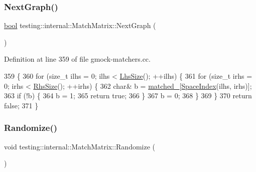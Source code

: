 \subsubsection{\texorpdfstring{Next\+Graph()}{NextGraph()}}
{\footnotesize\ttfamily \hyperlink{classbool}{bool} testing\+::internal\+::\+Match\+Matrix\+::\+Next\+Graph (\begin{DoxyParamCaption}{ }\end{DoxyParamCaption})}



Definition at line 359 of file gmock-\/matchers.\+cc.


\begin{DoxyCode}
359                             \{
360   \textcolor{keywordflow}{for} (\textcolor{keywordtype}{size\_t} ilhs = 0; ilhs < \hyperlink{classtesting_1_1internal_1_1MatchMatrix_a337d9793c61d985dbc1be166e34eed61}{LhsSize}(); ++ilhs) \{
361     \textcolor{keywordflow}{for} (\textcolor{keywordtype}{size\_t} irhs = 0; irhs < \hyperlink{classtesting_1_1internal_1_1MatchMatrix_aff068e9fed3a42466c5da8766ac43134}{RhsSize}(); ++irhs) \{
362       \textcolor{keywordtype}{char}& b = \hyperlink{classtesting_1_1internal_1_1MatchMatrix_ae01ec0d94b7812559acfcf84f10707e2}{matched\_}[\hyperlink{classtesting_1_1internal_1_1MatchMatrix_aa5c4d081304a4923df078bd153c735e4}{SpaceIndex}(ilhs, irhs)];
363       \textcolor{keywordflow}{if} (!b) \{
364         b = 1;
365         \textcolor{keywordflow}{return} \textcolor{keyword}{true};
366       \}
367       b = 0;
368     \}
369   \}
370   \textcolor{keywordflow}{return} \textcolor{keyword}{false};
371 \}
\end{DoxyCode}
\mbox{\label{classtesting_1_1internal_1_1MatchMatrix_aff1f0ae748f4a5c96117c0f27b493ac6}} 
\subsubsection{\texorpdfstring{Randomize()}{Randomize()}}
{\footnotesize\ttfamily void testing\+::internal\+::\+Match\+Matrix\+::\+Randomize (\begin{DoxyParamCaption}{ }\end{DoxyParamCaption})}



